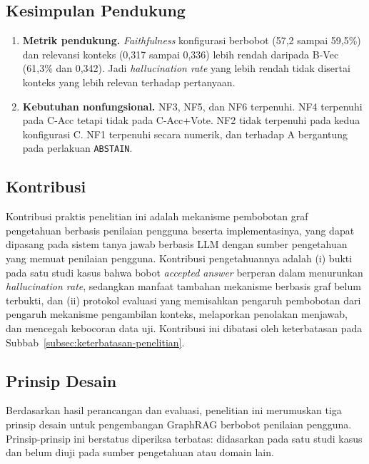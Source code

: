 \subsection{Kesimpulan Pendukung}
\label{subsec:kesimpulan-pendukung}

\begin{enumerate}
    \item \textbf{Metrik pendukung.} \emph{Faithfulness} konfigurasi berbobot (57,2 sampai 59,5\%) dan relevansi konteks (0,317 sampai 0,336) lebih rendah daripada B-Vec (61,3\% dan 0,342). Jadi \emph{hallucination rate} yang lebih rendah tidak disertai konteks yang lebih relevan terhadap pertanyaan.
    \item \textbf{Kebutuhan nonfungsional.} NF3, NF5, dan NF6 terpenuhi. NF4 terpenuhi pada C-Acc tetapi tidak pada C-Acc+Vote. NF2 tidak terpenuhi pada kedua konfigurasi C. NF1 terpenuhi secara numerik, dan terhadap A bergantung pada perlakuan \texttt{ABSTAIN}.
\end{enumerate}

\subsection{Kontribusi}
\label{subsec:kontribusi}

Kontribusi praktis penelitian ini adalah mekanisme pembobotan graf pengetahuan berbasis penilaian pengguna beserta implementasinya, yang dapat dipasang pada sistem tanya jawab berbasis LLM dengan sumber pengetahuan yang memuat penilaian pengguna. Kontribusi pengetahuannya adalah (i) bukti pada satu studi kasus bahwa bobot \emph{accepted answer} berperan dalam menurunkan \emph{hallucination rate}, sedangkan manfaat tambahan mekanisme berbasis graf belum terbukti, dan (ii) protokol evaluasi yang memisahkan pengaruh pembobotan dari pengaruh mekanisme pengambilan konteks, melaporkan penolakan menjawab, dan mencegah kebocoran data uji. Kontribusi ini dibatasi oleh keterbatasan pada Subbab~\ref{subsec:keterbatasan-penelitian}.

\subsection{Prinsip Desain}
\label{subsec:prinsip-desain}

Berdasarkan hasil perancangan dan evaluasi, penelitian ini merumuskan tiga prinsip desain untuk pengembangan GraphRAG berbobot penilaian pengguna. Prinsip-prinsip ini berstatus diperiksa terbatas: didasarkan pada satu studi kasus dan belum diuji pada sumber pengetahuan atau domain lain.

